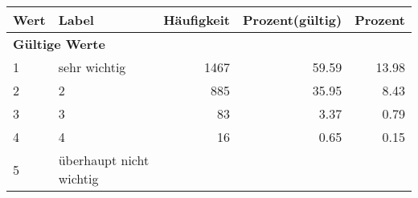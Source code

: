      \begin{longtable}{lXrrr}
     \toprule
     \textbf{Wert} & \textbf{Label} & \textbf{Häufigkeit} & \textbf{Prozent(gültig)} & \textbf{Prozent} \\
     \endhead
     \midrule
     \multicolumn{5}{l}{\textbf{Gültige Werte}}\\

     1 &
     \multicolumn{1}{X}{ sehr wichtig   } &


       \num{1467} &
       \num[round-mode=places,round-precision=2]{59.59} &
         \num[round-mode=places,round-precision=2]{13.98} \\

     2 &
     \multicolumn{1}{X}{ 2   } &


       \num{885} &
       \num[round-mode=places,round-precision=2]{35.95} &
         \num[round-mode=places,round-precision=2]{8.43} \\

     3 &
     \multicolumn{1}{X}{ 3   } &


       \num{83} &
       \num[round-mode=places,round-precision=2]{3.37} &
         \num[round-mode=places,round-precision=2]{0.79} \\

     4 &
     \multicolumn{1}{X}{ 4   } &


       \num{16} &
       \num[round-mode=places,round-precision=2]{0.65} &
         \num[round-mode=places,round-precision=2]{0.15} \\

     5 &
     \multicolumn{1}{X}{ überhaupt nicht wichtig   } &



\end{longtable}
